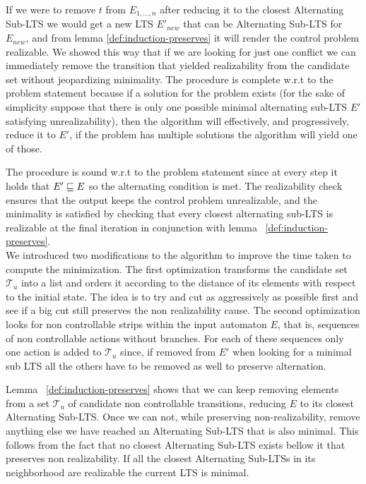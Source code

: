 If we were to remove $t$ from $E_{1,\ldots,n}$ after reducing it
to the closest Alternating Sub-LTS we would get a new LTS
$E'_{new}$ that can be Alternating Sub-LTS for $E_{new}$, and from lemma
\ref{def:induction-preserves} it will render the control problem
realizable.  We showed this way that if we are looking for just one
conflict we can immediately remove the transition that yielded realizability 
from the candidate set without jeopardizing minimality.
%
The procedure is complete w.r.t to the problem statement because
if a solution for the problem exists (for the sake of simplicity
suppose that there is only one possible minimal alternating sub-LTS $E'$
satisfying unrealizability), then the algorithm will effectively, and progressively,
reduce it to $E'$, if the problem has multiple solutions the
algorithm will yield one of those.

The procedure is sound w.r.t to the problem statement since 
at every step it holds that $E' \sqsubseteq E$ so the alternating condition
is met.  The realizability check ensures that the output keeps the
control problem unrealizable, and the minimality is satisfied by
checking that every closest alternating sub-LTS is realizable at the
final iteration in conjunction with lemma  ~\ref{def:induction-preserves}.\\

We introduced two modifications to the algorithm
to improve the time taken to compute the minimization.
The first optimization transforms the candidate set $\mathcal{T}_u$
into a list and orders it according to the distance of its elements 
with respect to the initial state.  The idea is to try and cut
as aggressively as possible first and see if a big cut still
preserves the non realizability cause.  The second optimization
looks for non controllable strips within the  input automaton
$E$, that is, sequences of non controllable actions without branches.
For each of these sequences only one action is
added to $\mathcal{T}_u$ since, if removed from $E'$
when looking for a minimal sub LTS all the others have to be removed
as well to preserve alternation.

Lemma ~\ref{def:induction-preserves} shows that we can keep removing
elements from a set $\mathcal{T}_u$ of candidate non controllable
transitions, reducing $E$ to its closest Alternating Sub-LTS.
 Once we can not,
while preserving non-realizability, remove
anything else we have reached an Alternating Sub-LTS that is also minimal.
This follows from the fact that
no closest Alternating Sub-LTS exists bellow it that preserves non realizability.
If all the closest Alternating Sub-LTSs in its neighborhood 
are realizable the current LTS is minimal.


